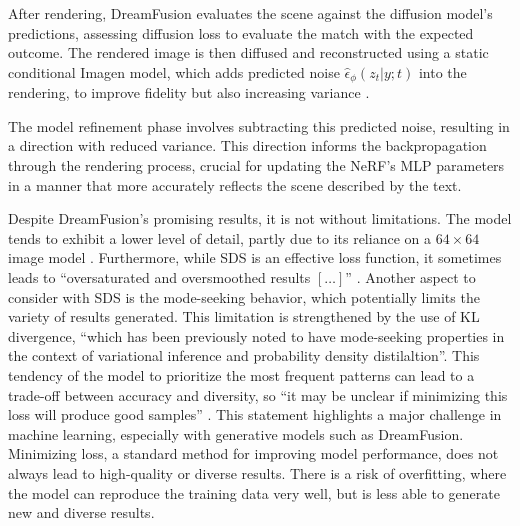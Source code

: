 After rendering, DreamFusion evaluates the scene against the diffusion model's predictions, assessing diffusion loss to evaluate the match with the expected outcome. The rendered image is then diffused and reconstructed using a static conditional Imagen model, which adds predicted noise \( \hat{\epsilon}_\phi(z_t | y; t) \) into the rendering, to improve fidelity but also increasing variance \citep{pooleDreamfusion}.

The model refinement phase involves subtracting this predicted noise, resulting in a direction with reduced variance. This direction informs the backpropagation through the rendering process, crucial for updating the NeRF's MLP parameters in a manner that more accurately reflects the scene described by the text.

Despite DreamFusion's promising results, it is not without limitations. The model tends to exhibit a lower level of detail, partly due to its reliance on a \( 64 \times 64 \) image model \citep{lin2022magic3d}. Furthermore, while SDS is an effective loss function, it sometimes leads to ``oversaturated and oversmoothed results \([\ldots]\)'' \citep{pooleDreamfusion}. Another aspect to consider with SDS is the mode-seeking behavior, which potentially limits the variety of results generated. This limitation is strengthened by the use of KL divergence, ``which has been previously noted to have mode-seeking properties in the context of variational inference and probability density distilaltion''\citep{pooleDreamfusion}. This tendency of the model to prioritize the most frequent patterns can lead to a trade-off between accuracy and diversity, so ``it may be unclear if minimizing this loss will produce good samples'' \citep{pooleDreamfusion}. This statement highlights a major challenge in machine learning, especially with generative models such as DreamFusion. Minimizing loss, a standard method for improving model performance, does not always lead to high-quality or diverse results. There is a risk of overfitting, where the model can reproduce the training data very well, but is less able to generate new and diverse results.